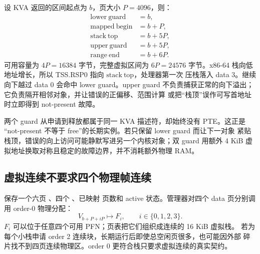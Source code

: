\begin{center}
\end{center}

设 KVA 返回的区间起点为 \(b\)，页大小 \(P=4096\)，则：
\[
\begin{aligned}
  \mathrm{lower\ guard} &= b,\\
  \mathrm{mapped\ begin} &= b+P,\\
  \mathrm{stack\ top} &= b+5P,\\
  \mathrm{upper\ guard} &= b+5P,\\
  \mathrm{range\ end} &= b+6P.
\end{aligned}
\]
可用容量为 \(4P=16384\) 字节，完整虚拟区间为 \(6P=24576\) 字节。x86-64
栈向低地址增长，所以 TSS.RSP0 指向 \(\mathrm{stack\ top}\)，处理器第一次
压栈落入 data 3。继续向下越过 data 0 会命中 lower guard。upper guard
不负责捕获正常的向下溢出；它负责隔开相邻对象，并让错误的正偏移、范围计算
或把“栈顶”误作可写首地址时立即得到 not-present 故障。

两个 guard 从申请到释放都属于同一 KVA 描述符，却始终没有 PTE。这正是
“not-present 不等于 free”的长期实例。若只保留 lower guard 而让下一对象
紧贴栈顶，错误的向上访问可能静默写进另一个内核对象；双 guard 用额外 4 KiB
虚拟地址换取对称且稳定的故障边界，并不消耗额外物理 RAM。

\subsection{虚拟连续不要求四个物理帧连续}

 保存一个六页
、四个 、已映射
页数和 active 状态。管理器对四个 data 页分别调用 order-0 物理分配：
\[
  V_{b+P+iP}\longmapsto F_i,\qquad i\in\{0,1,2,3\}.
\]
\(F_i\) 可以位于任意四个可用 PFN；页表把它们组织成连续的 16 KiB 虚拟栈。
若为每个小栈申请 order 2 连续块，长期运行后即使总空闲页很多，也可能因外部
碎片找不到四页连续物理区。order 0 更符合栈只要求虚拟连续的真实契约。

